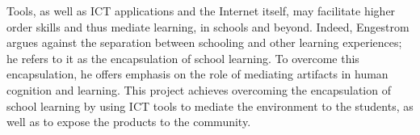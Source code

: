 Tools, as well as ICT applications and the Internet itself, may facilitate higher order skills and thus mediate learning, in schools and beyond\cite{kashdan_outdoors_2013}. Indeed, Engestrom\cite{engestrom_non_1991} argues against the separation between schooling and other learning experiences; he refers to it as the encapsulation of school learning. To overcome this encapsulation, he offers emphasis on the role of mediating artifacts in human cognition and learning.
This project achieves overcoming the encapsulation of school learning by using ICT tools to mediate the environment to the students, as well as to expose the products to the community\cite{kashdan_outdoors_2013}.